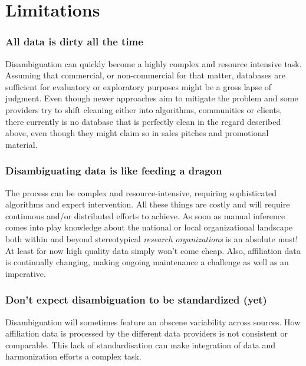 \documentclass[
  letterpaper,
]{scrreprt}
\begin{document}
\section{Limitations}\label{limitations-3}

\subsubsection{All data is dirty all the
time}\label{all-data-is-dirty-all-the-time}

Disambiguation can quickly become a highly complex and resource
intensive task. Assuming that commercial, or non-commercial for that
matter, databases are sufficient for evaluatory or exploratory purposes
might be a gross lapse of judgment. Even though newer approaches aim to
mitigate the problem and some providers try to shift cleaning either
into algorithms, communities or clients, there currently is no database
that is perfectly clean in the regard described above, even though they
might claim so in sales pitches and promotional material.

\subsubsection{Disambiguating data is like feeding a
dragon}\label{disambiguating-data-is-like-feeding-a-dragon}

The process can be complex and resource-intensive, requiring
sophisticated algorithms and expert intervention. All these things are
costly and will require continuous and/or distributed efforts to
achieve. As soon as manual inference comes into play knowledge about the
national or local organizational landscape both within and beyond
stereotypical \emph{research organizations} is an absolute must! At
least for now high quality data simply won't come cheap. Also,
affiliation data is continually changing, making ongoing maintenance a
challenge as well as an imperative.

\subsubsection{Don't expect disambiguation to be standardized
(yet)}\label{dont-expect-disambiguation-to-be-standardized-yet}

Disambiguation will sometimes feature an obscene variability across
sources. How affiliation data is processed by the different data
providers is not consistent or comparable. This lack of standardisation
can make integration of data and harmonization efforts a complex task.
\end{document}
